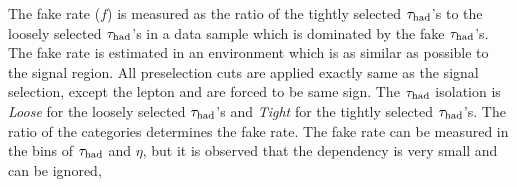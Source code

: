 The fake rate ($f$) is measured as the ratio of the tightly selected $\tau_{\rm had}$'s to the loosely 
selected $\tau_{\rm had}$'s in a data sample which is dominated by the fake $\tau_{\rm had}$'s. The fake rate is estimated in an environment which is as 
similar as possible to the signal region. 
All preselection cuts are applied exactly same as the signal selection,  except the lepton and \Tau are forced to be same sign. 
The $\tau_{\rm had}$ isolation is {\it Loose} for the loosely selected $\tau_{\rm had}$'s and {\it Tight} for the tightly selected $\tau_{\rm had}$'s.
The ratio of the  categories determines the fake rate. 
The fake rate can be measured in the bins of $\tau_{\rm had}$ \pt and $\eta$, but it is observed that the dependency is very small and can be ignored, 
